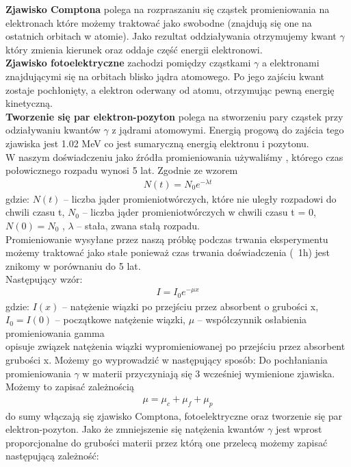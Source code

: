 \documentclass[a4paper]{article}
\newlength{\du}
\begin{document}
\textbf{Zjawisko Comptona} polega na rozpraszaniu się cząstek promieniowania na elektronach które możemy traktować jako swobodne (znajdują się one na ostatnich orbitach w atomie). Jako rezultat oddziaływania otrzymujemy kwant $\gamma$ który zmienia kierunek oraz oddaje część energii elektronowi.\\
\textbf{Zjawisko fotoelektryczne} zachodzi pomiędzy cząstkami $\gamma$ a elektronami znajdującymi się na orbitach blisko jądra atomowego. Po jego zajściu kwant zostaje pochłonięty, a elektron oderwany od atomu, otrzymując pewną energię kinetyczną.\\
 \textbf{Tworzenie się par elektron-pozyton} polega na stworzeniu pary cząstek przy odziaływaniu kwantów $\gamma$ z jądrami atomowymi. Energią progową do zajścia tego zjawiska jest 1.02 MeV co jest sumaryczną energią elektronu i pozytonu.\\
W naszym doświadczeniu jako źródła promieniowania używaliśmy , którego czas połowicznego rozpadu wynosi 5 lat. Zgodnie ze wzorem 
\begin{align*}
N(t) = N_0 e^{−\lambda t}
\end{align*}
gdzie:
$N(t)$ – liczba jąder promieniotwórczych, które nie uległy rozpadowi do chwili czasu t,
$N_0$ – liczba jąder promieniotwórczych w chwili czasu t = 0, $N(0) = N_0$ , $\lambda$ – stała, zwana stałą rozpadu.\\
Promieniowanie wysyłane przez naszą próbkę podczas trwania eksperymentu możemy traktować jako stałe ponieważ czas trwania doświadczenia (~1h) jest znikomy w porównaniu do 5 lat.\\
Następujący wzór:
\begin{align*}
I = I_0 e^{− \mu  x}
\end{align*}
gdzie: $I(x)$ – natężenie wiązki po przejściu przez absorbent o grubości x, $I_0 = I(0)$ – początkowe natężenie
wiązki, $\mu$ – współczynnik osłabienia promieniowania gamma\\
opisuje związek natężenia wiązki wypromieniowanej po przejściu przez absorbent grubości x. Możemy go wyprowadzić w następujący sposób:
Do pochłaniania promieniowania $\gamma$ w materii przyczyniają się 3 wcześniej wymienione zjawiska. Możemy to zapisać zależnością
\begin{align*}
\mu = \mu_c +\mu_f +\mu_p
\end{align*}
do sumy włączają się zjawisko Comptona, fotoelektryczne oraz tworzenie się par elektron-pozyton.
Jako że zmniejszenie się natężenia kwantów $\gamma$ jest wprost proporcjonalne do grubości materii przez którą one przelecą możemy zapisać następującą zależność:
\end{document}
